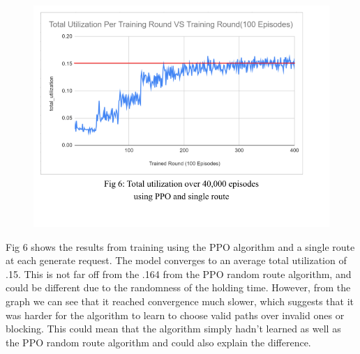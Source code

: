 \documentclass[conference]{IEEEtran}
\begin{document}
\begin{flushleft}
\begin{figure}[ht!]
    \includegraphics[width=.75\linewidth]{Final Paper Results And Graphs (3).png}
\end{figure}
Fig 6 shows the results from training using the PPO algorithm and a single route at each generate request. The model converges to an average total utilization of .15. This is not far off from the .164 from the PPO random route algorithm, and could be different due to the randomness of the holding time. However, from the graph we can see that it reached convergence much slower, which suggests that it was harder for the algorithm to learn to choose valid paths over invalid ones or blocking. This could mean that the algorithm simply hadn't learned as well as the PPO random route algorithm and could also explain the difference.

\end{flushleft}
\end{document}
